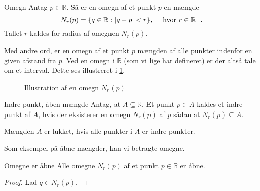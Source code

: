 \begin{definition}[label=def:omegn]{Omegn}{}
  Antag $p \in \mathbb{R}$. 
  Så er en omegn af et punkt $p$ en mængde 
  \[
  N_r(p)=\{ q \in \mathbb{R}:\abs{q-p} < r \}, \quad \text{ hvor }r \in \mathbb{R}^+. 
  \] 
  Tallet $r$ kaldes for radius af omegnen $N_r(p)$. 
\end{definition}
Med andre ord, er en omegn af et punkt $p$ mængden af alle punkter indenfor en given afstand fra $p$.
Ved en omegn i $\mathbb{R}$ (som vi lige har defineret) er der altså tale om et interval. 
Dette ses illustreret i \cref{fig:omegn}.
\begin{figure}[H]
\begin{center}
\end{center}
  \caption{Illustration af en omegn $N_r(p)$}
\label{fig:omegn}
\end{figure}

\begin{definition}[label=def:åben]{Indre punkt, åben mængde }{}
  Antag, at $A \subseteq \mathbb{R}$. 
  Et punkt $p \in A$ kaldes et indre punkt af $A$, hvis der eksisterer en omegn $N_r(p)$ af $p$ sådan at $N_r(p) \subseteq A$. 

  Mængden $A$ er lukket, hvis alle punkter i $A$ er indre punkter. 
\end{definition}

Som eksempel på åbne mængder, kan vi betragte omegne.

\begin{theorem}[label=theo:omegne_åbne]{Omegne er åbne}{}
  Alle omegne $N_r(p)$ af et punkt $p \in \mathbb{R}$ er åbne. 
\end{theorem}
\begin{proof} 
  Lad $q \in N_r(p)$.
\end{proof}


